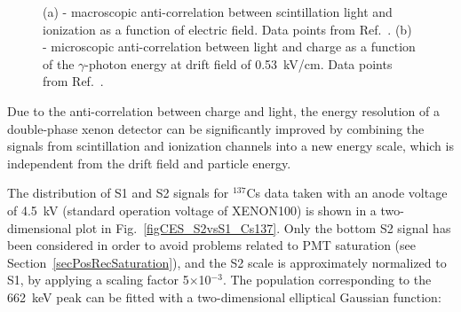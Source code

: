 \begin{figure}[!h]
\centering
{}
\caption[Macroscopic and microscopic anti-correlation between scintillation light and ionization]{(a) - macroscopic anti-correlation between scintillation light and ionization as a function of electric field. Data points from Ref.~\cite{CES_Conti}. (b) - microscopic anti-correlation between light and charge as a function of the $\gamma$-photon energy at drift field of 0.53~kV/cm. Data  points from Ref.~\cite{TeresaInternal}. }
\label{figMicroMacro}
\end{figure}

Due to the anti-correlation between charge and light, the energy resolution of a double-phase xenon detector can be significantly improved by combining the signals from scintillation and ionization channels into a new energy scale, which is independent from the drift field and particle energy.

The distribution of S1 and S2 signals for $^{137}$Cs data taken with an anode voltage of 4.5~kV (standard operation voltage of XENON100) is shown in a two-dimensional plot in Fig.~\ref{figCES_S2vsS1_Cs137}. Only the bottom S2 signal has been considered in order to avoid problems related to PMT saturation (see Section~\ref{secPosRecSaturation}), and the S2 scale is approximately normalized to S1, by applying a scaling factor 5$\times$10$^{-3}$. 
The population corresponding to the 662~keV peak can be fitted with a two-dimensional elliptical Gaussian function:

